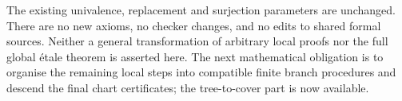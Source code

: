 \documentclass[11pt]{article}
\begin{document}
The existing univalence, replacement and surjection parameters are
unchanged. There are no new axioms, no checker changes, and no edits
to shared formal sources. Neither a general transformation of arbitrary
local proofs nor the full global \'etale theorem is asserted here.
The next mathematical obligation is to organise the remaining local
steps into compatible finite branch procedures and descend the final
chart certificates; the tree-to-cover part is now available.
\end{document}
